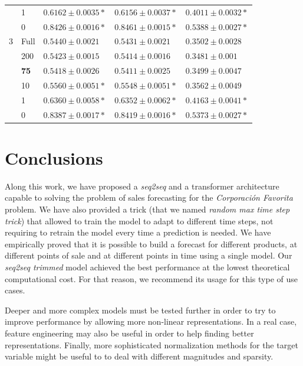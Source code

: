 \begin{table}[h]
\begin{tabular}{lllll}
      & 1               & $ 0.6162 \pm 0.0035 *$          & $ 0.6156 \pm 0.0037 *$         & $ 0.4011 \pm 0.0032 *$          \\
      & 0               & $ 0.8426 \pm 0.0016 *$          & $ 0.8461 \pm 0.0015 *$         & $ 0.5388 \pm 0.0027 *$          \\ \hline
		3      & Full            & $ 0.5440 \pm 0.0021 $           & $ 0.5431 \pm 0.0021 $          & $ 0.3502 \pm 0.0028 $          \\
      & 200             & $ 0.5423 \pm 0.0015 $           & $ 0.5414 \pm 0.0016 $          & $ 0.3481 \pm 0.001 $           \\
      & \textbf{75}     & $ \mathbf{0.5418 \pm 0.0026} $  & $ \mathbf{0.5411 \pm 0.0025} $ & $ \mathbf{0.3499 \pm 0.0047} $ \\
      & 10              & $ 0.5560 \pm 0.0051 *$          & $ 0.5548 \pm 0.0051 *$         & $ 0.3562 \pm 0.0049 $          \\
      & 1               & $ 0.6360 \pm 0.0058 *$          & $ 0.6352 \pm 0.0062 *$         & $ 0.4163 \pm 0.0041 *$          \\
      & 0               & $ 0.8387 \pm 0.0017 *$          & $ 0.8419 \pm 0.0016 *$         & $ 0.5373 \pm 0.0027 *$          \\ \hline
	\end{tabular}
\end{table}

\section{Conclusions} \label{sec:salesforecast_conclusions}

Along this work, we have proposed a \textit{seq2seq} and a transformer architecture capable to solving the problem of sales forecasting for the \textit{Corporación Favorita} problem. We have also provided a trick (that we named \textit{random max time step trick}) that allowed to train the model to adapt to different time steps, not requiring to retrain the model every time a prediction is needed. We have empirically proved that it is possible to build a forecast for different products, at different points of sale and at different points in time using a single model. Our \textit{seq2seq trimmed} model achieved the best performance at the lowest theoretical computational cost. For that reason, we recommend its usage for this type of use cases.

Deeper and more complex models must be tested further in order to try to improve performance by allowing more non-linear representations. In a real case, feature engineering may also be useful in order to help finding better representations. Finally, more sophisticated normalization methods for the target variable might be useful to to deal with different magnitudes and sparsity.

